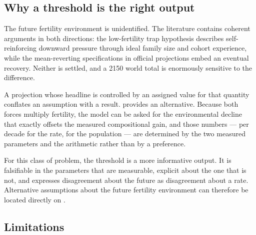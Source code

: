 \subsection{Why a threshold is the right output}

The future fertility environment is unidentified. The literature contains
coherent arguments in both directions: the low-fertility
trap hypothesis \citep{lutz2006} describes self-reinforcing downward pressure
through ideal family size and cohort experience, while the mean-reverting
specifications in official projections \citep{alkema2011,raftery2012} embed an
eventual recovery. Neither is settled, and a 2150 world total is enormously
sensitive to the difference.

A projection whose headline is controlled by an assigned value for that quantity
conflates an assumption with a result.  provides an alternative.
Because both forces multiply fertility, the model can be asked for the
environmental decline that exactly offsets the measured compositional gain, and
those numbers --- \BoundaryPaired{} per decade for the rate,
\BoundaryPopulation{} for the population --- are determined by the two measured
parameters and the arithmetic rather than by a preference.

For this class of problem, the threshold is a more informative output. It is
falsifiable in the parameters that are measurable, explicit about the one that is
not, and expresses disagreement about the future as disagreement about a rate.
Alternative assumptions about the future fertility environment can therefore be
located directly on .

\subsection{Limitations}
\label{sec:limitations}

